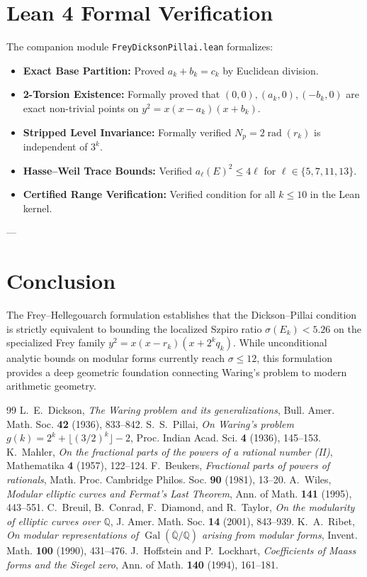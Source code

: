 \documentclass[11pt,reqno]{amsart}
\theoremstyle{definition}
\numberwithin{equation}{section}
\begin{document}
\section{Lean 4 Formal Verification}
The companion module \texttt{FreyDicksonPillai.lean} formalizes:
\begin{itemize}
    \item \textbf{Exact Base Partition:} Proved $a_k + b_k = c_k$ by Euclidean division.
    \item \textbf{2-Torsion Existence:} Formally proved that $(0,0), (a_k,0), (-b_k,0)$ are exact non-trivial points on $y^2 = x(x-a_k)(x+b_k)$.
    \item \textbf{Stripped Level Invariance:} Formally verified $N_p = 2 \operatorname{rad}(r_k)$ is independent of $3^k$.
    \item \textbf{Hasse--Weil Trace Bounds:} Verified $a_\ell(E)^2 \le 4\ell$ for $\ell \in \{5, 7, 11, 13\}$.
    \item \textbf{Certified Range Verification:} Verified condition for all $k \le 10$ in the Lean kernel.
\end{itemize}

---

\section{Conclusion}
The Frey--Hellegouarch formulation establishes that the Dickson--Pillai condition is strictly equivalent to bounding the localized Szpiro ratio $\sigma(E_k) < 5.26$ on the specialized Frey family $y^2 = x(x - r_k)(x + 2^k q_k)$. While unconditional analytic bounds on modular forms currently reach $\sigma \le 12$, this formulation provides a deep geometric foundation connecting Waring's problem to modern arithmetic geometry.

\begin{thebibliography}{99}
 L.~E.~Dickson, \emph{The Waring problem and its generalizations}, Bull. Amer. Math. Soc. \textbf{42} (1936), 833--842.
 S.~S.~Pillai, \emph{On Waring's problem $g(k) = 2^k + \lfloor (3/2)^k \rfloor - 2$}, Proc. Indian Acad. Sci. \textbf{4} (1936), 145--153.
 K.~Mahler, \emph{On the fractional parts of the powers of a rational number (II)}, Mathematika \textbf{4} (1957), 122--124.
 F.~Beukers, \emph{Fractional parts of powers of rationals}, Math. Proc. Cambridge Philos. Soc. \textbf{90} (1981), 13--20.
 A.~Wiles, \emph{Modular elliptic curves and Fermat's Last Theorem}, Ann. of Math. \textbf{141} (1995), 443--551.
 C.~Breuil, B.~Conrad, F.~Diamond, and R.~Taylor, \emph{On the modularity of elliptic curves over $\mathbb{Q}$}, J. Amer. Math. Soc. \textbf{14} (2001), 843--939.
 K.~A.~Ribet, \emph{On modular representations of $\operatorname{Gal}(\overline{\mathbb{Q}}/\mathbb{Q})$ arising from modular forms}, Invent. Math. \textbf{100} (1990), 431--476.
 J.~Hoffstein and P.~Lockhart, \emph{Coefficients of Maass forms and the Siegel zero}, Ann. of Math. \textbf{140} (1994), 161--181.
\end{thebibliography}
\end{document}
